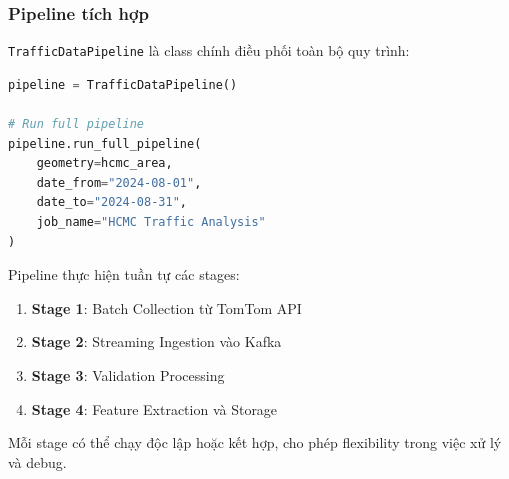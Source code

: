 \subsubsection{Pipeline tích hợp}

\texttt{TrafficDataPipeline} là class chính điều phối toàn bộ quy trình:

\begin{lstlisting}[language=Python, caption={Pipeline tích hợp}]
pipeline = TrafficDataPipeline()

# Run full pipeline
pipeline.run_full_pipeline(
    geometry=hcmc_area,
    date_from="2024-08-01",
    date_to="2024-08-31",
    job_name="HCMC Traffic Analysis"
)
\end{lstlisting}

Pipeline thực hiện tuần tự các stages:
\begin{enumerate}
    \item \textbf{Stage 1}: Batch Collection từ TomTom API
    \item \textbf{Stage 2}: Streaming Ingestion vào Kafka
    \item \textbf{Stage 3}: Validation Processing
    \item \textbf{Stage 4}: Feature Extraction và Storage
\end{enumerate}

Mỗi stage có thể chạy độc lập hoặc kết hợp, cho phép flexibility trong việc xử lý và debug.

\newpage
\newpage

